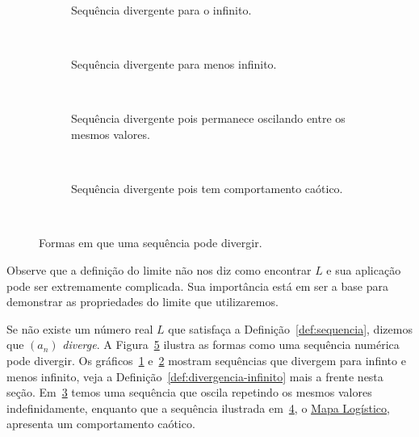 \begin{figure}[t]
\centering
\begin{subfigure}{\linewidth}
  \centering
  
  \caption{Sequência divergente para o infinito.}
  \label{fig:sequencia_divergente_1}
\end{subfigure}\\
\begin{subfigure}{\linewidth}
  \centering
  
  \caption{Sequência divergente para menos infinito.}
  \label{fig:sequencia_divergente_2}
\end{subfigure}\\
\begin{subfigure}{\linewidth}
  \centering
  
  \caption{Sequência divergente pois permanece oscilando entre os mesmos valores.}
  \label{fig:sequencia_divergente_3}
\end{subfigure}\\
\begin{subfigure}{\linewidth}
  \centering
  
  \caption{Sequência divergente pois tem comportamento caótico.}
  \label{fig:sequencia_divergente_4}
\end{subfigure}\\
\caption{Formas em que uma sequência pode divergir.}
\label{fig:sequencia_divergente}
\end{figure}

Observe que a definição do limite não nos diz como encontrar $L$ e sua aplicação
pode ser extremamente complicada. Sua importância está em ser a base para
demonstrar as propriedades do limite que utilizaremos.

Se não existe um número real $L$ que satisfaça a Definição~\ref{def:sequencia},
dizemos que $(a_n)$ \emph{diverge}.
A Figura~\ref{fig:sequencia_divergente} ilustra as formas como uma sequência
numérica pode divergir.
Os gráficos~\ref{fig:sequencia_divergente_1} e~\ref{fig:sequencia_divergente_2}
mostram sequências que divergem para infinto e menos infinito, veja a
Definição~\ref{def:divergencia-infinito} mais a frente nesta seção.
Em~\ref{fig:sequencia_divergente_3} temos uma sequência que oscila repetindo
os mesmos valores indefinidamente, enquanto que a sequência ilustrada
em~\ref{fig:sequencia_divergente_4}, o
\href{https://pt.wikipedia.org/wiki/Mapa_log%C3%ADstico}{Mapa Logístico}\index{Mapa logístico},
apresenta um comportamento caótico.

